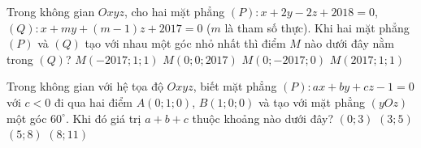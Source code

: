 \begin{ex}%
	Trong không gian $Oxyz$, cho hai mặt phẳng $(P)\colon x+2y-2z+2018=0$, $(Q)\colon x+my+(m-1)z+2017=0$ ($m$ là tham số thực). Khi hai mặt phẳng $(P)$ và $(Q)$ tạo với nhau một góc nhỏ nhất thì điểm $M$ nào dưới đây nằm trong $(Q)$?
	\choice
	{\True $M(-2017;1;1)$}
	{$M(0;0;2017)$}
	{$M(0;-2017;0)$}
	{$M(2017;1;1)$}
\end{ex}
\begin{ex}%
	Trong không gian với hệ tọa độ $Oxyz$, biết mặt phẳng $(P):ax+by+cz-1=0$ với $c<0$ đi qua hai điểm $A(0;1;0)$, $B(1;0;0)$ và tạo với mặt phẳng $(yOz)$ một góc $60^\circ$. Khi đó giá trị $a+b+c$ thuộc khoảng nào dưới đây?
	\choice
	{\True $(0;3)$}
	{$(3;5)$}
	{$(5;8)$}
	{$(8;11)$}
\end{ex}
